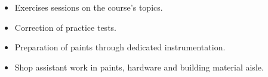 \documentclass[10pt,a4paper]{altacv}
\begin{document}

\begin{itemize}
\item  Exercises sessions on the course's topics.
\item  Correction of practice tests.
\end{itemize}












\begin{itemize}
\item Preparation of paints through dedicated instrumentation.
\item Shop assistant work in paints, hardware and building material aisle.  

\end{itemize}






\clearpage
\end{document}
